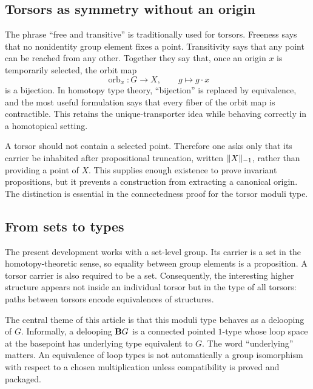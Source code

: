 \subsection{Torsors as symmetry without an origin}
The phrase ``free and transitive'' is traditionally used for torsors. Freeness says that no nonidentity group element fixes a point. Transitivity says that any point can be reached from any other. Together they say that, once an origin $x$ is temporarily selected, the orbit map
\begin{equation}
\operatorname{orb}_x:G\longrightarrow X, \qquad g\longmapsto g\cdot x
\end{equation}
is a bijection. In homotopy type theory, ``bijection'' is replaced by equivalence, and the most useful formulation says that every fiber of the orbit map is contractible. This retains the unique-transporter idea while behaving correctly in a homotopical setting.

\begin{remark}
A torsor should not contain a selected point. Therefore one asks only that its carrier be inhabited after propositional truncation, written $\lVert X \rVert_{-1}$, rather than providing a point of $X$. This supplies enough existence to prove invariant propositions, but it prevents a construction from extracting a canonical origin. The distinction is essential in the connectedness proof for the torsor moduli type.
\end{remark}

\subsection{From sets to types}
The present development works with a set-level group. Its carrier is a set in the homotopy-theoretic sense, so equality between group elements is a proposition. A torsor carrier is also required to be a set. Consequently, the interesting higher structure appears not inside an individual torsor but in the type of all torsors: paths between torsors encode equivalences of structures.

The central theme of this article is that this moduli type behaves as a delooping of $G$. Informally, a delooping $\mathbf{B}G$ is a connected pointed $1$-type whose loop space at the basepoint has underlying type equivalent to $G$. The word ``underlying'' matters. An equivalence of loop types is not automatically a group isomorphism with respect to a chosen multiplication unless compatibility is proved and packaged.

